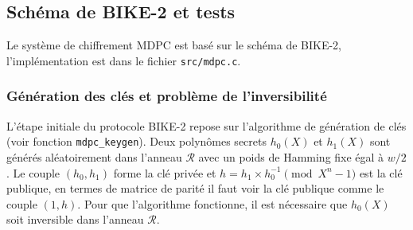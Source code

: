 \documentclass[11pt,a4paper]{article}
\begin{document}
%
%
%

\subsection{Schéma de BIKE-2 et tests}

Le système de chiffrement MDPC est basé sur le schéma de BIKE-2,
l'implémentation est dans le fichier \texttt{src/mdpc.c}.

\subsubsection{Génération des clés et problème de l'inversibilité}

L'étape initiale du protocole BIKE-2 repose sur l'algorithme de génération de
clés (voir fonction \texttt{mdpc\_keygen}).
Deux polynômes secrets $h_0(X)$ et $h_1(X)$ sont générés aléatoirement dans
l'anneau $\mathcal{R}$ avec un poids de Hamming fixe égal à $w/2$.
Le couple $(h_0, h_1)$ forme la clé privée et $h = h_1 \times h_0^{-1}
\pmod{X^n-1}$ est la clé publique, en termes de matrice de parité il faut voir
la clé publique comme le couple $(1, h)$.
Pour que l'algorithme fonctionne, il est nécessaire que $h_0(X)$ soit inversible
dans l'anneau $\mathcal{R}$.
\end{document}
